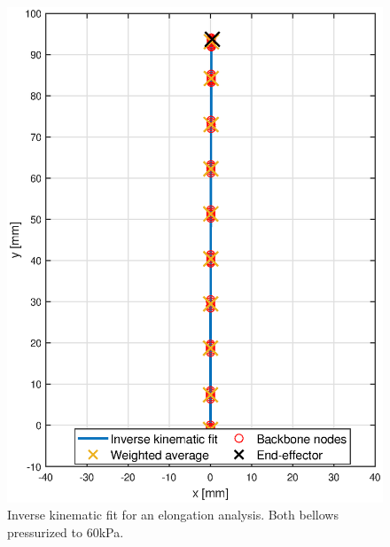 \begin{figure}[H]
    \centering
\begin{minipage}{0.5\textwidth}
        \centering
        \includegraphics[width=\textwidth]{Figures/Chapter3/nodalfitelong.eps}
        \caption{Inverse kinematic fit for an elongation analysis. Both bellows pressurized to 60kPa.}
        \label{fig3:nodalfitelong}
    \end{minipage}\hfill
    \begin{minipage}{0.5\textwidth}
        \centering

\end{minipage}
\end{figure}
